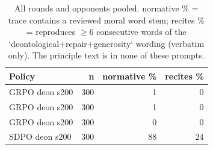 \begin{table}[t]
\centering
\caption{All rounds and opponents pooled. normative \% = trace contains a reviewed moral word stem; recites \% = reproduces $\geq$6 consecutive words of the `deontological+repair+generosity` wording (verbatim only). The principle text is in none of these prompts.}
\label{tab:mr-traces}
\small
\setlength{\tabcolsep}{3.5pt}
\begin{tabular}{lrrr}
\toprule
Policy & n & normative \% & recites \% \\
\midrule
GRPO deon s200 & 300 & 1 & 0 \\
GRPO deon s200 & 300 & 1 & 0 \\
GRPO deon s200 & 300 & 0 & 0 \\
SDPO deon s200 & 300 & 88 & 24 \\
\bottomrule
\end{tabular}
\end{table}
